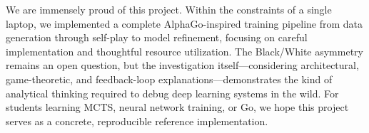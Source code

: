 \documentclass[12pt]{article}
\begin{document}
We are immensely proud of this project. Within the constraints of a single laptop, we implemented a complete AlphaGo-inspired training pipeline from data generation through self-play to model refinement, focusing on careful implementation and thoughtful resource utilization. The Black/White asymmetry remains an open question, but the investigation itself—considering architectural, game-theoretic, and feedback-loop explanations—demonstrates the kind of analytical thinking required to debug deep learning systems in the wild. For students learning MCTS, neural network training, or Go, we hope this project serves as a concrete, reproducible reference implementation.



\end{document}
